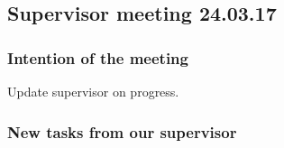 \documentclass{article}
\begin{document}
\begin{center}
\subsection*{Supervisor meeting 24.03.17}
\end{center}

\bigskip


\subsubsection*{Intention of the meeting}
Update supervisor on progress.

\subsubsection*{New tasks from our supervisor}
\end{document}
